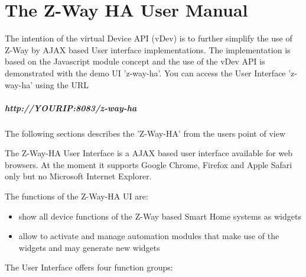 \chapter{The Z-Way HA User Manual}
\label{vdev}

The intention of the virtual Device API (vDev) is to further simplify the use of Z-Way
by AJAX based User interface implementations. The implementation is based on the
Javascript module concept  and the use of the vDev API is demonstrated with the 
demo UI 'z-way-ha'. You can access the User Interface 'z-way-ha' using the URL

\paragraph{http://YOURIP:8083/z-way-ha}
\paragraph{}

The following sections describes the 'Z-Way-HA' from the users point of view  

The Z-Way-HA User Interface is a AJAX based user interface available for web browsers. At 
the moment it supports Google Chrome, Firefox and Apple Safari only but no Microsoft Internet
Explorer.

The functions of the Z-Way-HA UI are:

\begin{itemize}
\item show all device functions of the Z-Way based Smart Home systems as widgets
\item allow to activate and manage automation modules that make use of the widgets
and may generate new widgets
\end{itemize}

The User Interface offers four function groups:

